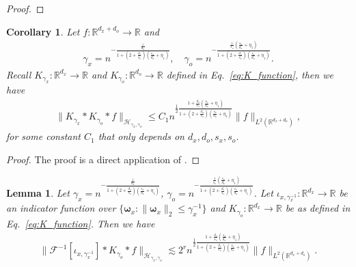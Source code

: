 \documentclass[11pt]{article}
\newcommand{\bomega}{\boldsymbol{\omega}}
\newcommand{\calF}{\mathcal{F}}
\newcommand{\calH}{\mathcal{H}}
\newcommand{\R}{\mathbb{R}}
\newcommand{\0}{\mathbf{0}}
\newtheorem{cor}{Corollary}[section]
\newtheorem{lem}{Lemma}[section]
\begin{document}
\begin{appendix}
\begin{proof}
\end{proof}
\begin{cor}
\label{cor:hang_prop_4_obs_cov}
    Let $f:\R^{d_x+d_o}\to \R$ and 
    \begin{align*}
        \gamma_x = n^{-\frac{\frac{1}{d_x}}{1+(2+\frac{d_o}{s_o})(\frac{s_x}{d_x}+\eta_1)}},\quad \gamma_o = n^{-\frac{\frac{1}{s_o}(\frac{s_x}{d_x}+\eta_1)}{1+(2+\frac{d_o}{s_o})(\frac{s_x}{d_x}+\eta_1)}}.
    \end{align*}
    Recall $K_{\gamma_x}:\R^{d_x} \to \R$ and $K_{\gamma_o}:\R^{d_o} \to \R$ defined in Eq.~\eqref{eq:K_function}, then we have
    \begin{align*}
        \|K_{\gamma_x} \ast K_{\gamma_o} \ast f\|_{\calH_{\gamma_x,\gamma_o}} \leq C_{1} 
        n^{\frac{1}{2} \frac{1+\frac{d_o}{s_o}(\frac{s_x}{d_x}+\eta_1)}{1+(2+\frac{d_o}{s_o})(\frac{s_x}{d_x}+\eta_1)}}
        \|f\|_{L^2(\R^{d_x+d_o})},
    \end{align*}
    for some constant $C_1$ that only depends on $d_x,d_o,s_x,s_o$.
\end{cor}
\begin{proof}
    The proof is a direct application of .
\end{proof}

\begin{lem}\label{lem:mixed_convolution}
    Let $\gamma_x = n^{-\frac{\frac{1}{d_x}}{1+(2+\frac{d_o}{s_o})(\frac{s_x}{d_x}+\eta_1)}}$, $\gamma_o = n^{-\frac{\frac{1}{s_o}(\frac{s_x}{d_x}+\eta_1)}{1+(2+\frac{d_o}{s_o})(\frac{s_x}{d_x}+\eta_1)}}$. 
    Let $\iota_{x,\gamma_x^{-1}} : \R^{d_x} \to \R$ be an indicator function over $\{\bomega_x: \|\bomega_x\|_2 \leq \gamma_x^{-1} \}$ and $K_{\gamma_o}: \R^{d_x} \to \R$ be as defined in Eq.~\eqref{eq:K_function}.
    Then we have
    \begin{align*}
        \|\calF^{-1}[\iota_{x,\gamma_x^{-1}}] \ast K_{\gamma_o} \ast f\|_{\calH_{\gamma_x,\gamma_o}} \lesssim 2^{r} n^{\frac{1}{2} \frac{1+\frac{d_o}{s_o}(\frac{s_x}{d_x}+\eta_1)}{1+(2+\frac{d_o}{s_o})(\frac{s_x}{d_x}+\eta_1)}} \|f\|_{L^2(\R^{d_x+d_o})} .
    \end{align*}
\end{lem}


\end{appendix}
\end{document}

